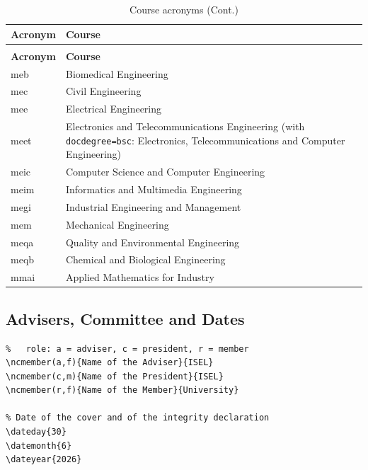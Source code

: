 \begin{xltabular}{\linewidth}{ >{\ttfamily}l X }
\caption{Course acronyms}
\label{tab:courses} \\
    \toprule
\textbf{\sffamily Acronym} & \textbf{Course} \\
    \midrule
\endfirsthead
\caption[]{Course acronyms (Cont.)} \\
    \toprule
\textbf{\sffamily Acronym} & \textbf{Course} \\
    \midrule
\endhead
\endfoot
    \bottomrule
\endlastfoot
meb   & Biomedical Engineering \\
mec   & Civil Engineering \\
mee   & Electrical Engineering \\
meet  & Electronics and Telecommunications Engineering \newline (with \texttt{docdegree=bsc}: Electronics, Telecommunications and Computer Engineering) \\
meic  & Computer Science and Computer Engineering \\
meim  & Informatics and Multimedia Engineering \\
megi  & Industrial Engineering and Management \\
mem   & Mechanical Engineering \\
meqa  & Quality and Environmental Engineering \\
meqb  & Chemical and Biological Engineering \\
mmai  & Applied Mathematics for Industry \\
\end{xltabular}

\subsection{Advisers, Committee and Dates} %
\label{ssec:advisers_committee_dates}

\begin{Verbatim}[breaklines=true, breakanywhere=true]
% (role,gender){Name}{Affiliation}
%   role: a = adviser, c = president, r = member
\ncmember(a,f){Name of the Adviser}{ISEL}
\ncmember(c,m){Name of the President}{ISEL}
\ncmember(r,f){Name of the Member}{University}

% Date of the cover and of the integrity declaration
\dateday{30}
\datemonth{6}
\dateyear{2026}
\end{Verbatim}

